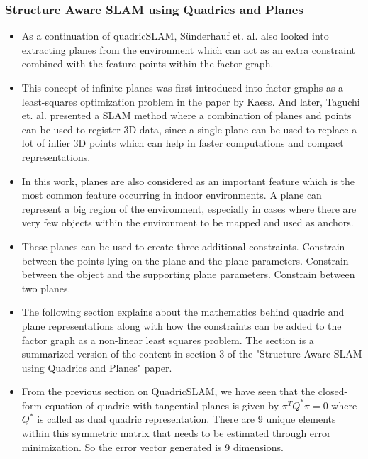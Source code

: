 \documentclass{article}
\begin{document}
\subsubsection{Structure Aware SLAM using Quadrics and Planes\cite{StructureAS}}
\begin{itemize}
    \item As a continuation of quadricSLAM, Sünderhauf et. al. also looked into extracting planes from the environment which can act as an extra constraint combined with the feature points within the factor graph\cite{StructureAS}.
    \item This concept of infinite planes was first introduced into factor graphs as a least-squares optimization problem in the paper by Kaess\cite{infiniteplanes}. And later, Taguchi et. al. presented a SLAM method where a combination of planes and points can be used to register 3D data, since a single plane can be used to replace a lot of inlier 3D points which can help in faster computations and compact representations.\cite{infpla2}
    \item In this work, planes are also considered as an important feature which is the most common feature occurring in indoor environments. A plane can represent a big region of the environment, especially in cases where there are very few objects within the environment to be mapped and used as anchors.
    \item These planes can be used to create three additional constraints. Constrain between the points lying on the plane and the plane parameters. Constrain between the object and the supporting plane parameters. Constrain between two planes.
    \item The following section explains about the mathematics behind quadric and plane representations along with how the constraints can be added to the factor graph as a non-linear least squares problem. The section is a summarized version of the content in section 3 of the "Structure Aware SLAM using Quadrics and Planes" paper\cite{StructureAS}.
    \item From the previous section on QuadricSLAM, we have seen that the closed-form equation of quadric with tangential planes is given by $\pi^{T}Q^{*}\pi = 0$ where $Q^{*}$ is called as dual quadric representation. There are 9 unique elements within this symmetric matrix that needs to be estimated through error minimization. So the error vector generated is 9 dimensions.
\begin{equation}
{
\begin{aligned}

\end{aligned}}
\end{equation}
\end{itemize}
\end{document}
